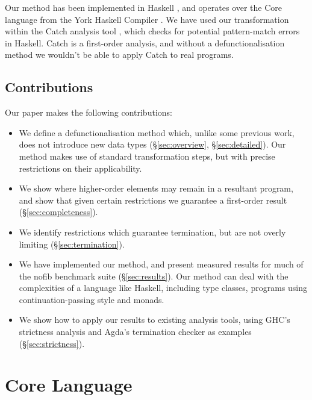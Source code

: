\documentclass[preprint]{sigplanconf}
\begin{document}
\negsmallskip

Our method has been implemented in Haskell \cite{haskell}, and operates over the Core language from the York Haskell Compiler \cite{me:yhc_core}. We have used our transformation within the Catch analysis tool \cite{me:catch}, which checks for potential pattern-match errors in Haskell. Catch is a first-order analysis, and without a defunctionalisation method we wouldn't be able to apply Catch to real programs.

\subsection{Contributions}

Our paper makes the following contributions:

\begin{itemize}
\item We define a defunctionalisation method which, unlike some previous work, does not introduce new data types (\S\ref{sec:overview}, \S\ref{sec:detailed}). Our method makes use of standard transformation steps, but with precise restrictions on their applicability.
\item We show where higher-order elements may remain in a resultant program, and show that given certain restrictions we guarantee a first-order result (\S\ref{sec:completeness}).
\item We identify restrictions which guarantee termination, but are not overly limiting (\S\ref{sec:termination}).
\item We have implemented our method, and present measured results for much of the nofib benchmark suite (\S\ref{sec:results}). Our method can deal with the complexities of a language like Haskell, including type classes, programs using continuation-passing style and monads.
\item We show how to apply our results to existing analysis tools, using GHC's strictness analysis and Agda's termination checker as examples (\S\ref{sec:strictness}).
\end{itemize}

\section{Core Language}
\label{sec:core}
\end{document}
